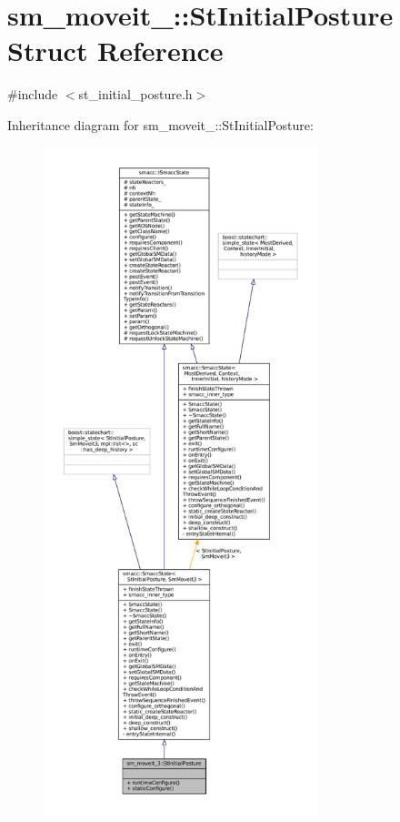 \hypertarget{structsm__moveit__3_1_1StInitialPosture}{}\section{sm\+\_\+moveit\+\_\+:\+:St\+Initial\+Posture Struct Reference}
\label{structsm__moveit__3_1_1StInitialPosture}


{\ttfamily \#include $<$st\+\_\+initial\+\_\+posture.\+h$>$}



Inheritance diagram for sm\+\_\+moveit\+\_\+:\+:St\+Initial\+Posture\+:
\nopagebreak
\begin{figure}[H]
\begin{center}
\leavevmode
\includegraphics[height=550pt]{structsm__moveit__3_1_1StInitialPosture__inherit__graph}
\end{center}
\end{figure}


